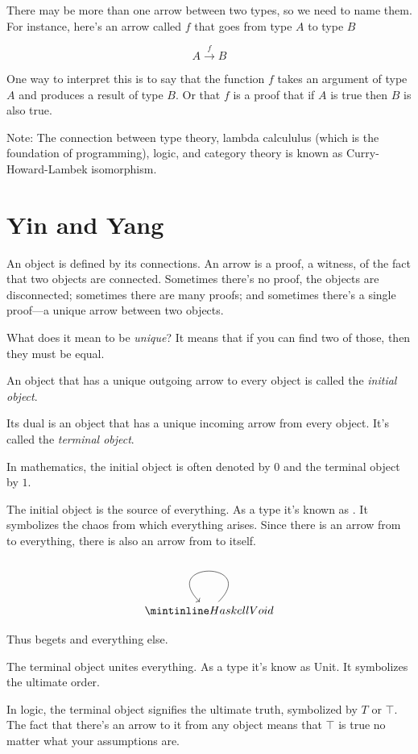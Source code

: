 \documentclass[DaoFP]{subfiles}
\begin{document}
There may be more than one arrow between two types, so we need to name them. For instance, here's an arrow called $f$ that goes from type $A$ to type $B$

\[ A \xrightarrow f B \]

One way to interpret this is to say that the function $ f$ takes an argument of type $A$ and produces a result of type $B$. Or that $ f$ is a proof that if $A$ is true then $B$ is also true.

Note: The connection between type theory, lambda calcululus (which is the foundation of programming), logic, and category theory is known as Curry-Howard-Lambek isomorphism.

\section{Yin and Yang}

An object is defined by its connections. An arrow is a proof, a witness, of the fact that two objects are connected. Sometimes there's no proof, the objects are disconnected; sometimes there are many proofs; and sometimes there's a single proof---a unique arrow between two objects.

What does it mean to be \emph{unique}? It means that if you can find two of those, then they must be equal.

An object that has a unique outgoing arrow to every object is called the \emph{initial object}.

Its dual is an object that has a unique incoming arrow from every object. It's called the \emph{terminal object}. 

In mathematics, the initial object is often denoted by $0$ and the terminal object by $1$.

The initial object is the source of everything. As a type it's known as . It symbolizes the chaos from which everything arises. Since there is an arrow from  to everything, there is also an arrow from  to itself. 

\[
 \begin{tikzcd}
 \hask{Void}
 \arrow[loop]
 \end{tikzcd}
\]

Thus  begets  and everything else.

The terminal object unites everything. As a type it's know as Unit. It symbolizes the ultimate order.

In logic, the terminal object signifies the ultimate truth, symbolized by $T$ or $ \top$. The fact that there's an arrow to it from any object means that $ \top$ is true no matter what your assumptions are. 
\end{document}
